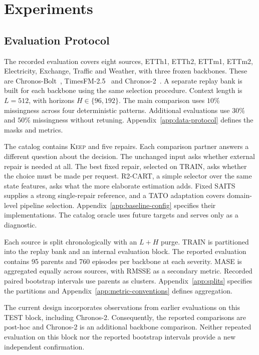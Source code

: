 \documentclass{article}
\begin{document}
\section{Experiments}
\label{sec:exp}

\subsection{Evaluation Protocol}
\label{sec:exp-setup}
The recorded evaluation covers eight sources, ETTh1, ETTh2, ETTm1, ETTm2, Electricity,
Exchange, Traffic and Weather, with three frozen backbones. These are
Chronos-Bolt~\citep{chronosbolt2025}, TimesFM-2.5~\citep{das2024timesfm} and
Chronos-2~\citep{chronos2_2025}. A separate replay bank is built for each backbone using the
same selection procedure. Context length is $L=512$, with horizons $H \in \{96,192\}$.
The main comparison uses $10\%$ missingness across four deterministic patterns.
Additional evaluations use $30\%$ and $50\%$ missingness without retuning.
Appendix~\ref{app:data-protocol} defines the masks and metrics.

The catalog contains \textsc{Keep} and five repairs. Each comparison partner answers a
different question about the decision. The unchanged input asks whether external repair is
needed at all. The best fixed repair, selected on TRAIN, asks whether the choice must be made
per request. R2-CART, a simple selector over the same state features, asks what the more
elaborate estimation adds. Fixed SAITS supplies a strong single-repair reference, and a TATO
adaptation covers domain-level pipeline selection. Appendix~\ref{app:baseline-config}
specifies their implementations. The catalog oracle uses future targets and serves only as a
diagnostic.

Each source is split chronologically with an $L+H$ purge. TRAIN is partitioned into the
replay bank and an internal evaluation block. The reported evaluation contains 95 parents
and 760 episodes per backbone at each severity. MASE is aggregated equally across sources,
with RMSSE as a secondary metric. Recorded paired bootstrap intervals use parents as clusters.
Appendix~\ref{app:splits} specifies the partitions and Appendix~\ref{app:metric-conventions}
defines aggregation.

The current design incorporates observations from earlier evaluations on this TEST block,
including Chronos-2. Consequently, the reported comparisons are post-hoc and Chronos-2 is
an additional backbone comparison. Neither repeated evaluation on this block nor the reported
bootstrap intervals provide a new independent confirmation.
\end{document}

